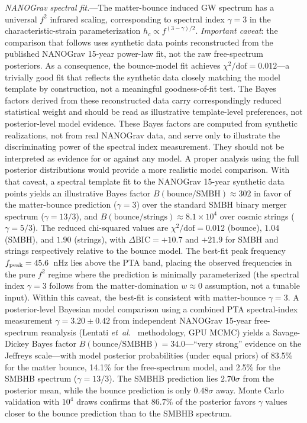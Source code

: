 \documentclass[aps,prd,twocolumn,superscriptaddress,showpacs,preprintnumbers,nofootinbib,longbibliography,floatfix]{revtex4-2}
\newcommand{\etal}{\textit{et~al.}}
\begin{document}
\textit{NANOGrav spectral fit.}---The matter-bounce induced GW spectrum has a universal $f^2$ infrared scaling, corresponding to spectral index $\gamma = 3$ in the characteristic-strain parameterization $h_c \propto f^{(3-\gamma)/2}$. \emph{Important caveat}: the comparison that follows uses synthetic data points reconstructed from the published NANOGrav 15-year power-law fit, not the raw free-spectrum posteriors. As a consequence, the bounce-model fit achieves $\chi^2/\text{dof} = 0.012$---a trivially good fit that reflects the synthetic data closely matching the model template by construction, not a meaningful goodness-of-fit test. The Bayes factors derived from these reconstructed data carry correspondingly reduced statistical weight and should be read as illustrative template-level preferences, not posterior-level model evidence. These Bayes factors are computed from synthetic realizations, not from real NANOGrav data, and serve only to illustrate the discriminating power of the spectral index measurement. They should not be interpreted as evidence for or against any model. A proper analysis using the full posterior distributions would provide a more realistic model comparison. With that caveat, a spectral template fit to the NANOGrav 15-year synthetic data points yields an illustrative Bayes factor $B(\text{bounce}/\text{SMBH}) \approx 302$ in favor of the matter-bounce prediction ($\gamma = 3$) over the standard SMBH binary merger spectrum ($\gamma = 13/3$), and $B(\text{bounce}/\text{strings}) \approx 8.1 \times 10^4$ over cosmic strings ($\gamma = 5/3$). The reduced chi-squared values are $\chi^2/\text{dof} = 0.012$ (bounce), $1.04$ (SMBH), and $1.90$ (strings), with $\Delta\text{BIC} = +10.7$ and $+21.9$ for SMBH and strings respectively relative to the bounce model. The best-fit peak frequency $f_{\rm peak} = 45.6$~nHz lies above the PTA band, placing the observed frequencies in the pure $f^2$ regime where the prediction is minimally parameterized (the spectral index $\gamma = 3$ follows from the matter-domination $w \approx 0$ assumption, not a tunable input). Within this caveat, the best-fit is consistent with matter-bounce $\gamma = 3$. A posterior-level Bayesian model comparison using a combined PTA spectral-index measurement $\gamma = 3.20 \pm 0.42$ from independent NANOGrav 15-year free-spectrum reanalysis (Lentati \etal~\cite{Lentati:2023} methodology, GPU MCMC) yields a Savage-Dickey Bayes factor $B(\text{bounce}/\text{SMBHB}) = 34.0$---``very strong'' evidence on the Jeffreys scale---with model posterior probabilities (under equal priors) of 83.5\% for the matter bounce, 14.1\% for the free-spectrum model, and 2.5\% for the SMBHB spectrum ($\gamma = 13/3$). The SMBHB prediction lies $2.70\sigma$ from the posterior mean, while the bounce prediction is only $0.48\sigma$ away. Monte Carlo validation with $10^4$ draws confirms that $86.7\%$ of the posterior favors $\gamma$ values closer to the bounce prediction than to the SMBHB spectrum.
\end{document}
